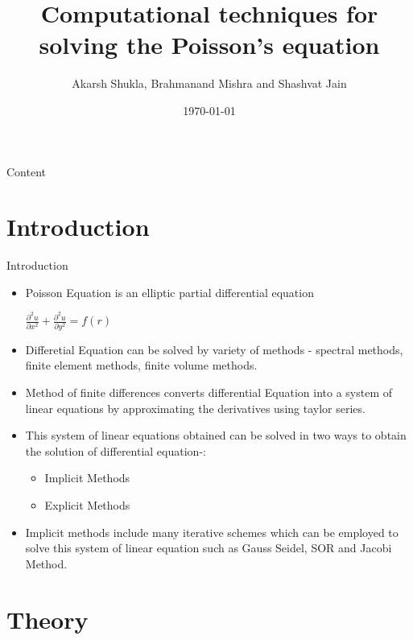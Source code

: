 \documentclass{beamer}
\title{Computational techniques for solving the Poisson’s equation}
\date{\today}
\author{Akarsh Shukla, Brahmanand Mishra and Shashvat Jain}
\begin{document}
\maketitle
	\begin{frame}[allowframebreaks]{Content}
		\fontsize{10pt}{5mm}\selectfont
				\tableofcontents
	\end{frame}

\section{Introduction}
	\begin{frame}{Introduction}
		\begin{itemize}
			\item  Poisson Equation is an \alert{elliptic} partial differential equation \\ 
			\begin{center}
				{$\boxed{ \frac{\partial^2 u}{\partial x^2} + \frac{\partial^2 u}{\partial y^2} =  f({r})} $}
			\end{center}
			\item Differetial Equation can be solved by variety of methods - spectral methods, finite element methods, finite volume methods. 
			\item Method of finite differences converts differential Equation into a system of linear equations by approximating the derivatives using taylor series. 
			\item This system of linear equations obtained can be solved in two ways to obtain the solution of differential equation-:
				\begin{itemize}
					\item Implicit Methods
					\item Explicit Methods
				\end{itemize}
			
			\item Implicit methods include many iterative schemes which can be employed to solve this system of linear equation such as \alert{Gauss Seidel, SOR} and \alert{Jacobi Method}.
		\end{itemize}
	\end{frame}
\section{Theory}
\end{document}
